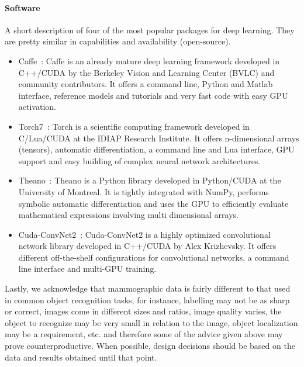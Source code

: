 \paragraph{Software}A short description of four of the most popular packages for deep learning. They are pretty similar in capabilities and availability (open-source).

\begin{itemize}
	\item Caffe~\cite{Jia2014}: Caffe is an already mature deep learning framework developed in C++/CUDA by the Berkeley Vision and Learning Center (BVLC) and community contributors. It offers a command line, Python and Matlab interface, reference models and tutorials and very fast code with easy GPU activation.
	\item Torch7~\cite{Collobert2011}: Torch is a scientific computing framework developed in C/Lua/CUDA at the IDIAP Research Institute. It offers n-dimensional arrays (tensors), automatic differentiation, a command line and Lua interface, GPU support and easy building of complex neural network architectures.
	\item Theano~\cite{Bergstra2010, Bastien2012}: Theano is a Python library developed in Python/CUDA at the University of Montreal. It is tightly integrated with NumPy, performs symbolic automatic differentiation and uses the GPU to efficiently evaluate mathematical expressions involving multi dimensional arrays.
	\item Cuda-ConvNet2~\cite{Krizhevsky2014}: Cuda-ConvNet2 is a highly optimized convolutional network library developed in C++/CUDA by Alex Krizhevsky. It offers different off-the-shelf configurations for convolutional networks, a command line interface and multi-GPU training.
\end{itemize}

\bigskip

Lastly, we acknowledge that mammographic data is fairly different to that used in common object recognition tasks, for instance, labelling may not be as sharp or correct, images come in different sizes and ratios, image quality varies, the object to recognize may be very small in relation to the image, object localization may be a requirement, etc. and therefore some of the advice given above may prove counterproductive. When possible, design decisions should be based on the data and results obtained until that point.


